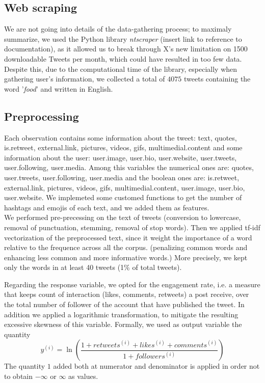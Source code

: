 \documentclass{article}
\begin{document}
\subsection{Web scraping}
We are not going into details of the data-gathering process; to maximaly summarize, we used the Python library \textit{ntscraper} (insert link to reference to documentation), as it allowed us to break through X's new limitation on 1500 downloadable Tweets per month, which could have resulted in too few data. Despite this, due to the computational time of the library, especially when gathering user's information, we collected a total of $4075$ tweets containing the word '\textit{food}' and written in English.
\subsection{Preprocessing}
Each observation contains some information about the tweet: text, quotes, is.retweet, external.link, pictures, videos, gifs, multimedial.content and some information about the user: user.image, user.bio, user.website, user.tweets, user.following, user.media.
Among this variables the numerical ones are: quotes, user.tweets, user.following, user.media and the boolean ones are: is.retweet, external.link, pictures, videos, gifs, multimedial.content, user.image, user.bio, user.website.
\noindent We implemeted some customed functions to get the number of hashtags and emojis of each text, and we added them as features.\\
We performed pre-precessing on the text of tweets (conversion to lowercase, removal of punctuation, stemming, removal of stop words). Then we applied tf-idf vectorization of the preprocessed text, since it weight the importance of a word relative to the frequence across all the corpus. (penalizing common words and enhancing less common and more informative words.)
More precisely, we kept only the words in at least 40 tweets (1\% of total tweets).



\noindent Regarding the response variable, we opted for the engagement rate, i.e. a measure that keeps count of interaction (likes, comments, retweets) a post receive, over the total number of follower of the account that have published the tweet. In addition we applied a logarithmic transformation, to mitigate the resulting excessive skewness of this variable.
Formally, we used as output variable the quantity $$y^{(i)} = \ln \left( \frac{1+retweets^{(i)}+likes^{(i)}+comments^{(i)}}{1+followers^{(i)}} \right)$$
The quantity $1$ added both at numerator and denominator is applied in order not to obtain $-\infty$ or $\infty$ as values.
\end{document}
